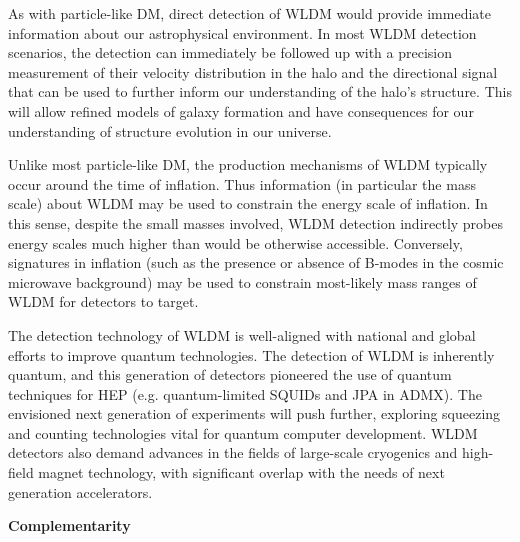 \documentclass[nofootinbib]{article}
\begin{document}
As with particle-like DM, direct detection of WLDM would provide immediate information about our astrophysical environment. In most WLDM detection scenarios, the detection can immediately be followed up with a precision measurement of their velocity distribution in the halo and the directional signal that can be used to further inform our understanding of the halo's structure. This will allow refined models of galaxy formation and have consequences for our understanding of structure evolution in our universe.

Unlike most particle-like DM, the production mechanisms of WLDM typically occur around the time of inflation. Thus information (in particular the mass scale) about WLDM may be used to constrain the energy scale of inflation. In this sense, despite the small masses involved, WLDM detection indirectly probes energy scales much higher than would be otherwise accessible. Conversely, signatures in inflation (such as the presence or absence of B-modes in the cosmic microwave background) may be used to constrain most-likely mass ranges of WLDM for detectors to target.

The detection technology of WLDM is well-aligned with national and global efforts to improve quantum technologies. The detection of WLDM is inherently quantum, and this generation of detectors pioneered the use of quantum techniques for HEP (e.g. quantum-limited SQUIDs and JPA in ADMX). The envisioned next generation of experiments will push further, exploring squeezing and counting technologies vital for quantum computer development. WLDM detectors also demand advances in the fields of large-scale cryogenics and high-field magnet technology, with significant overlap with the needs of next generation accelerators.



\vspace{1em}
\noindent
{\bf Complementarity}
\end{document}
